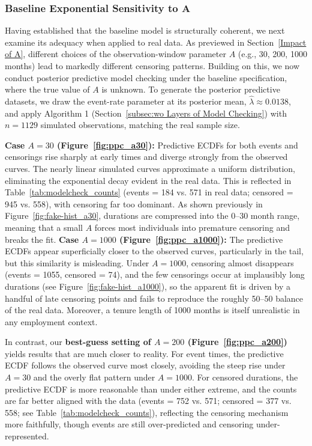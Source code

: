 \subsubsection{Baseline Exponential Sensitivity to A}
\label{res:baseline_ecdf}
Having established that the baseline model is structurally coherent, we next examine its adequacy when applied to real data. As previewed in Section~\ref{Impact of A}, different choices of the observation-window parameter $A$ (e.g., 30, 200, 1000 months) lead to markedly different censoring patterns. Building on this, we now conduct posterior predictive model checking under the baseline specification, where the true value of $A$ is unknown. To generate the posterior predictive datasets, we draw the event-rate parameter at its posterior mean, $\hat{\lambda} \approx 0.0138$, and apply Algorithm 1 (Section~\ref{subsec:wo Layers of Model Checking}) with $n=1129$ simulated observations, matching the real sample size.

\textbf{Case $A=30$ (Figure~\ref{fig:ppc_a30}):} Predictive ECDFs for both events and censorings rise sharply at early times and diverge strongly from the observed curves. The nearly linear simulated curves approximate a uniform distribution, eliminating the exponential decay evident in the real data. This is reflected in Table~\ref {tab:modelcheck_counts} (events = 184 vs. 571 in real data; censored = 945 vs. 558), with censoring far too dominant. As shown previously in Figure~\ref{fig:fake-hist_a30}, durations are compressed into the 0–30 month range, meaning that a small $A$ forces most individuals into premature censoring and breaks the fit. \textbf{Case $A=1000$ (Figure~\ref{fig:ppc_a1000}):} The predictive ECDFs appear superficially closer to the observed curves, particularly in the tail, but this similarity is misleading. Under $A=1000$, censoring almost disappears (events = 1055, censored = 74), and the few censorings occur at implausibly long durations (see Figure~\ref{fig:fake-hist_a1000}), so the apparent fit is driven by a handful of late censoring points and fails to reproduce the roughly 50–50 balance of the real data. Moreover, a tenure length of 1000 months is itself unrealistic in any employment context.

In contrast, our \textbf{best-guess setting of $A=200$ (Figure~\ref{fig:ppc_a200})} yields results that are much closer to reality. For event times, the predictive ECDF follows the observed curve most closely, avoiding the steep rise under $A=30$ and the overly flat pattern under $A=1000$. For censored durations, the predictive ECDF is more reasonable than under either extreme, and the counts are far better aligned with the data (events = 752 vs. 571; censored = 377 vs. 558; see Table~\ref{tab:modelcheck_counts}), reflecting the censoring mechanism more faithfully, though events are still over-predicted and censoring under-represented.

